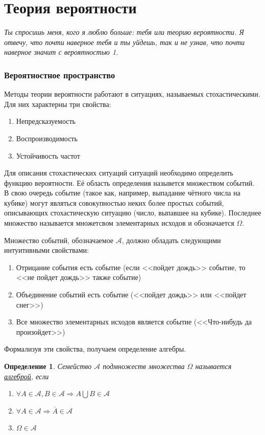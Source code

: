\documentclass[12pt]{article}
\newtheorem{Def}{Определение}
\numberwithin{Th}{section}
\numberwithin{Def}{section}
\numberwithin{Lem}{section}
\numberwithin{St}{section}
\numberwithin{equation}{section}
\newcommand\Ev{\mathscr{A}} %
\begin{document}
\tableofcontents
\newpage

\part{Теория вероятности}

\textit{Ты спросишь меня, кого я люблю больше: тебя или теорию вероятности. Я отвечу, что почти наверное тебя и ты уйдешь, так и не узнав, что почти наверное значит с вероятностью 1.}

\newpage

\section{Вероятностное пространство}
\qquad Методы теории вероятности работают в ситуациях, называемых стохастическими. Для них характерны три свойства:
\begin{enumerate}
	\item Непредсказуемость 
	\item Воспроизводимость 
	\item Устойчивость частот
\end{enumerate}

Для описания стохастических ситуаций ситуаций необходимо определить функцию вероятности. Её область определения назывется множеством событий.
В свою очередь событие (такое как, например, выпадание чётного числа на кубике) могут являться совокупностью неких более простых событий, описывающих стохастическую ситуацию (число, выпавшее на кубике). Последнее множество называется множетсвом элементарных исходов и обозначается $\Omega$.  

Множество событий, обозначаемое $\Ev$, должно обладать следующими интуитивными свойствами:
\begin{enumerate}
	\item Отрицание события есть событие (если <<пойдет дождь>> событие, то <<не пойдет дождь>> также событие)
	\item Объединение событий есть событие (<<пойдет дождь>> или <<пойдет снег>>)
	\item Все множество элементарных исходов является событие (<<Что-нибудь да произойдет>>)
\end{enumerate}

Формализуя эти свойства, получаем определение алгебры.
\begin{Def}
Семейство $\Ev$ подмножеств множества $\Omega$  называется \\ \underline{алгеброй}, если 
\begin{enumerate}
	\item $\forall A \in \Ev, B\in \Ev \Rightarrow A \bigcup B \in \Ev$
	\item $\forall A \in \Ev \Rightarrow \overline{A} \in \Ev$
	\item $\Omega \in \Ev$
\end{enumerate}
\end{Def}
\end{document}
